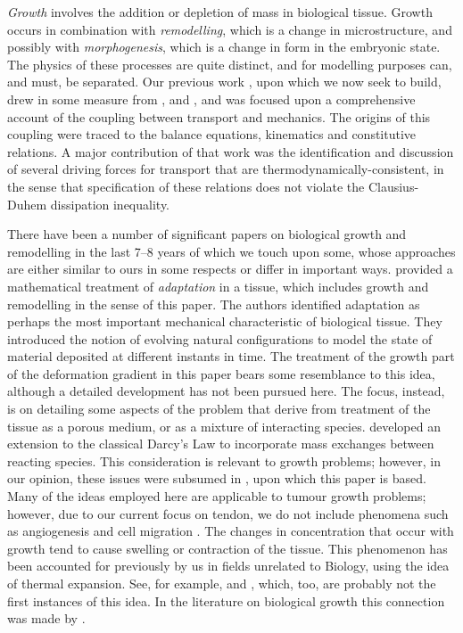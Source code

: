 \emph{Growth} involves the addition or depletion of mass in biological
tissue. Growth occurs in combination with
\emph{remodelling}, which is a change in microstructure, and possibly
with \emph{morphogenesis}, which is a change in form in the embryonic
state. The physics of these processes are quite distinct, and for
modelling purposes can, and must, be separated. Our previous work
\citep{growthpaper}, upon which we now seek to build, drew in some
measure from \citet{CowinHegedus:76, EpsteinMaugin:2000}, and
\citet{TaberHumphrey:2001}, and was focused upon a comprehensive
account of the coupling between transport and mechanics. The origins
of this coupling were traced to the balance equations, kinematics and
constitutive relations. A major contribution of that work was the
identification and discussion of several driving forces for transport
that are thermodynamically-consistent, in the sense that specification
of these relations does not violate the Clausius-Duhem dissipation
inequality. 

There have been a number of significant papers on biological growth
and remodelling in the last 7--8 years of which we touch upon some,
whose approaches are either similar to ours in some respects or differ
in important ways. \citet{HumphreyRajagopal:02} provided a
mathematical treatment of \emph{adaptation} in a tissue, which includes 
growth and remodelling in the sense of this paper. The authors
identified adaptation as perhaps the most important mechanical
characteristic of biological tissue. They introduced the notion of evolving
natural configurations to model the state of material deposited at
different instants in time. The treatment of the growth part of the
deformation gradient in this paper bears some resemblance to this
idea, although a detailed development has not been pursued here. The
focus, instead, is on detailing some aspects of the problem that
derive from treatment of the tissue as a porous medium, or as a
mixture of interacting species. \citet{PreziosiFarina:2002} developed an
extension to the classical Darcy's Law to incorporate mass exchanges
between reacting species. This consideration is relevant to growth
problems; however, in our opinion, these issues were subsumed in
\citet{growthpaper}, upon which this paper is based. Many of the ideas
employed here are applicable to tumour growth problems; however, due
to our current focus on tendon, we do not include phenomena
such as angiogenesis and cell migration \citep[see for
  example][]{Brewardetal:2003}. The changes in concentration that
occur with growth tend to cause swelling or contraction of the
tissue. This phenomenon has been accounted for previously by us in fields unrelated to
Biology, using the idea of thermal expansion. See, for
example, \citet{Rao2:00} and \citet{Garikipatietal:01}, which, too,
are probably not the first instances of this idea. In the literature
on biological 
growth this connection was made by \citet{KlischHoger:2003}.

